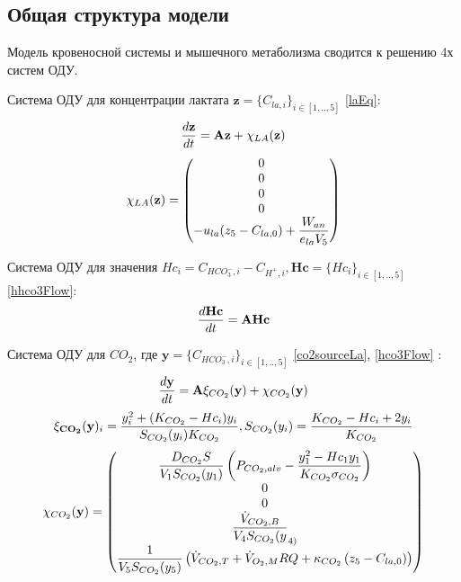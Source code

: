 \subsection{Общая структура модели}
Модель кровеносной системы и мышечного метаболизма сводится к решению 4х систем ОДУ.

Система ОДУ для концентрации лактата $\mathbf{z} = \{ C_{la,i} \}_{i \in [1,..,5]}$ \eqref{laEq}:
\begin{equation}
\frac{d\textbf{z}}{dt}=\textbf{A}\textbf{z}+\mathbf{\chi}_{LA}(\textbf{z})\notag
\end{equation}
\begin{equation}
\mathbf{\chi}_{LA}(\textbf{z})=\begin{pmatrix}
0 \\
0 \\
0 \\
0 \\
\displaystyle -u_{la}(z_{5}-C_{la,0})+\frac{W_{an}}{e_{la}V_{5}}
\end{pmatrix}\notag
\end{equation}

Система ОДУ для значения $Hc_{i}=C_{HCO_{3}^{-},i}-C_{H^{+},i}, \mathbf{Hc} = \{ Hc_i \}_{i \in [1,..,5]}$ \eqref{hhco3Flow}:
\begin{equation}
\frac{d \textbf{Hc}}{dt}= \mathbf{A Hc} \notag
\end{equation}

Система ОДУ для $CO_{2}$, где $\mathbf{y}=\{ C_{HCO_{3}^{-},i} \}_{i \in [1,..,5]}$ \eqref{co2sourceLa}, \eqref{hco3Flow}  :
\begin{equation}
\displaystyle \frac{d\textbf{y}}{dt}
=\mathbf{A}\mathbf{\xi}_{CO_{2}}(\textbf{y})+\mathbf{\chi}_{CO_{2}}(\textbf{y})\notag
\end{equation}
\begin{equation}
\mathbf{\xi_{CO_{2}}}(\textbf{y})_{i}=\frac{y_{i}^2+(K_{CO_{2}}-Hc_{i})y_{i}}{S_{CO_{2}}(y_{i})K_{CO_{2}}}, S_{CO_{2}}(y_{i})=\frac{K_{CO_{2}}-Hc_{i}+2y_{i}}{K_{CO_{2}}}\notag
\end{equation}
\begin{equation}
\mathbf{\chi}_{CO_{2}}(\mathbf{y})=\begin{pmatrix}
\displaystyle \frac{D_{CO_{2}}S}{V_{1}S_{CO_{2}}(y_{1})}\left(P_{CO_{2},alv}-\frac{y_{1}^2-Hc_{1}y_{1}}{K_{CO_{2}} \sigma_{CO_{2}}} \right) \\
0 \\
0 \\
\displaystyle \frac{\dot{V}_{CO_{2},B}}{V_{4}S_{CO_{2}}(y}_{4)} \\
\displaystyle \frac{1}{V_{5}S_{CO_{2}}(y_{5})}\left(\dot{V}_{CO_{2},T}+\dot{V}_{O_{2},M}RQ+\kappa_{CO_{2}}\left(z_{5}-C_{la,0}\right) \right)
\end{pmatrix} \notag
\end{equation}


